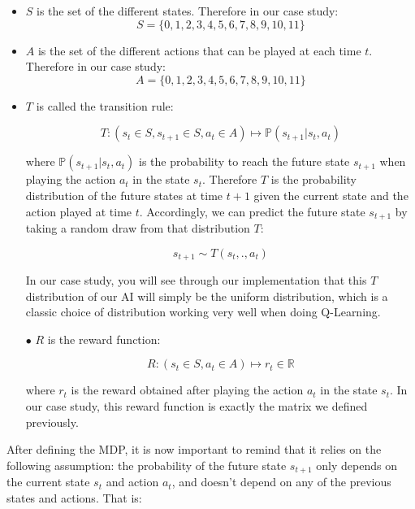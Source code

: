 \documentclass[]{book}
\begin{document}
\begin{itemize}

\item $S$ is the set of the different states. Therefore in our case study: $$ S = \{0,1,2,3,4,5,6,7,8,9,10,11\} $$

\item $A$ is the set of the different actions that can be played at each time $t$. Therefore in our case study: $$ A = \{0,1,2,3,4,5,6,7,8,9,10,11\} $$

\item $T$ is called the transition rule:

\begin{equation*}
T : (s_t \in S, s_{t+1} \in S, a_t \in A) \mapsto \mathbb{P}(s_{t+1}|s_t,a_t)
\end{equation*}

where $\mathbb{P}(s_{t+1}|s_t,a_t)$ is the probability to reach the future state $s_{t+1}$ when playing the action $a_t$ in the state $s_t$. Therefore $T$ is the probability distribution of the future states at time $t+1$ given the current state and the action played at time $t$. Accordingly, we can predict the future state $s_{t+1}$ by taking a random draw from that distribution $T$:

\begin{equation*}
s_{t+1} \sim T(s_t,.,a_t) 
\end{equation*}

In our case study, you will see through our implementation that this $T$ distribution of our AI will simply be the uniform distribution, which is a classic choice of distribution working very well when doing Q-Learning.

\item[$\bullet$] $R$ is the reward function:

\begin{equation*}
R : (s_t \in S, a_t \in A) \mapsto r_t \in \mathbb{R}
\end{equation*}

where $r_t$ is the reward obtained after playing the action $a_t$ in the state $s_t$. In our case study, this reward function is exactly the matrix we defined previously.

\end{itemize}

After defining the MDP, it is now important to remind that it relies on the following assumption: the probability of the future state \(s_{t+1}\) only depends on the current state \(s_t\) and action \(a_t\), and doesn't depend on any of the previous states and actions. That is:
\end{document}
